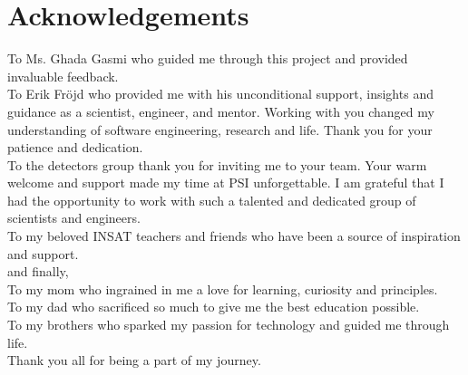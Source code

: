 \chapter*{Acknowledgements}

To Ms. Ghada Gasmi who guided me through this project and provided invaluable feedback.\\

To Erik Fröjd who provided me with his unconditional support, insights and guidance as a 
scientist, engineer, and mentor. Working with you changed my understanding of software 
engineering, research and life. Thank you for your patience and dedication.\\

To the detectors group thank you for inviting me to your team. Your warm welcome and
support made my time at PSI unforgettable. I am grateful that I had the opportunity to work
with such a talented and dedicated group of scientists and engineers.\\

To my beloved INSAT teachers and friends who have been a source of inspiration and support.\\

and finally,\\
To my mom who ingrained in me a love for learning, curiosity and principles.\\

To my dad who sacrificed so much to give me the best education possible.\\

To my brothers who sparked my passion for technology and guided me through life.\\

Thank you all for being a part of my journey.\\